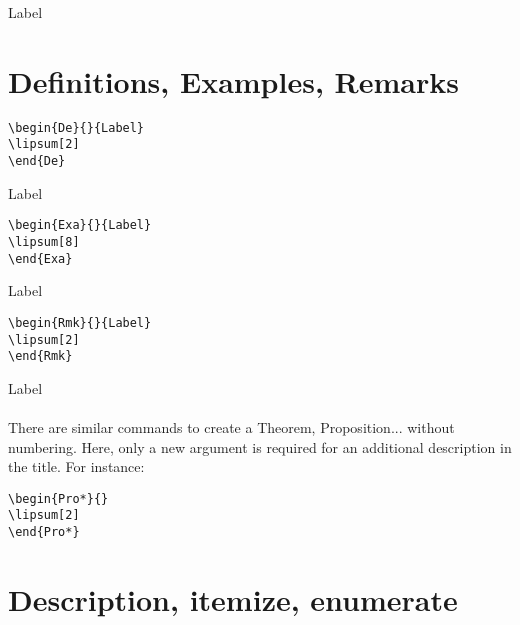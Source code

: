 \begin{Co}{}{Label}
\lipsum[2]
\end{Co}
\section{Definitions, Examples, Remarks}
\begin{verbatim}
\begin{De}{}{Label}
\lipsum[2]
\end{De}
\end{verbatim}

\begin{De}{}{Label}
\lipsum[2]
\end{De}
\begin{verbatim}
\begin{Exa}{}{Label}
\lipsum[8]
\end{Exa}
\end{verbatim}

\begin{Exa}{}{Label}
\lipsum[8]
\end{Exa}
\begin{verbatim}
\begin{Rmk}{}{Label}
\lipsum[2]
\end{Rmk}
\end{verbatim}

\begin{Rmk}{}{Label}
\lipsum[2]
\end{Rmk}
\paragraph*{}
There are similar commands to create a Theorem, Proposition... without numbering. Here, only a new argument is required for an additional description in the title. For instance:

\begin{verbatim}
\begin{Pro*}{}
\lipsum[2]
\end{Pro*}
\end{verbatim}

\begin{Pro*}{}
\lipsum[2]
\end{Pro*}
\section{Description, itemize, enumerate}
